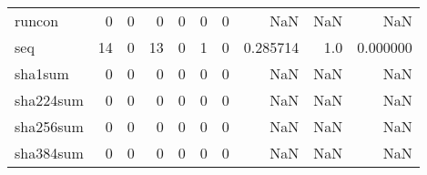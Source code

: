 \begin{longtable}{lrrrrrrrrr}
runcon    &                                                  0 &                                                  0 &                                                  0 &                                                  0 &                                                  0 &                                                  0 &                                                NaN &                                    NaN &                                  NaN \\
seq       &                                                 14 &                                                  0 &                                                 13 &                                                  0 &                                                  1 &                                                  0 &                                           0.285714 &                                    1.0 &                             0.000000 \\
sha1sum   &                                                  0 &                                                  0 &                                                  0 &                                                  0 &                                                  0 &                                                  0 &                                                NaN &                                    NaN &                                  NaN \\
sha224sum &                                                  0 &                                                  0 &                                                  0 &                                                  0 &                                                  0 &                                                  0 &                                                NaN &                                    NaN &                                  NaN \\
sha256sum &                                                  0 &                                                  0 &                                                  0 &                                                  0 &                                                  0 &                                                  0 &                                                NaN &                                    NaN &                                  NaN \\
sha384sum &                                                  0 &                                                  0 &                                                  0 &                                                  0 &                                                  0 &                                                  0 &                                                NaN &                                    NaN &                                  NaN \\

\end{longtable}
